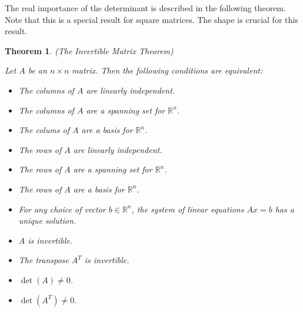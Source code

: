 \documentclass[10pt,]{book}
\theoremstyle{plain}
\newtheorem{theorem}{Theorem}[chapter]
\theoremstyle{definition}
\numberwithin{equation}{section}
\begin{document}
      The real importance of the determinant is described in the following
      theorem. Note that this is a special result for square matrices.
      The shape is crucial for this result.
\begin{theorem}\label{theorem-9}
(The Invertible Matrix Theorem)
        
          Let \(A\) be an \(n\times n\) matrix. Then the following conditions
          are equivalent:
\begin{itemize}
\item{}The columns of \(A\) are linearly independent.\item{}The columns of \(A\) are a spanning set for \(\mathbb{R}^n\).\item{}The colums of \(A\) are a basis for \(\mathbb{R}^n\).\item{}The rows of \(A\) are linearly independent.\item{}The rows of \(A\) are a spanning set for \(\mathbb{R}^n\).\item{}The rows of \(A\) are a basis for \(\mathbb{R}^n\).\item{}For any choice of vector \(b \in \mathbb{R}^n\), the system of linear
            equations \(Ax = b\) has a unique solution.\item{}\(A\) is invertible.\item{}The transpose \(A^T\) is invertible.\item{}\(\det(A) \neq 0\).\item{}\(\det(A^T) \neq 0\).\end{itemize}
\end{theorem}
\typeout{************************************************}
\typeout{************************************************}
\end{document}

